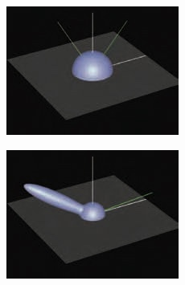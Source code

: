 \begin{figure}
\begin{fullwidth}
\begin{center}
	\begin{subfigure}[b]{0.328\thewidth}
		\includegraphics[width=1.\textwidth]{graphics/gi/ray-optics-8-1}
	\end{subfigure}
	\begin{subfigure}[b]{0.328\thewidth}
		\includegraphics[width=1.\textwidth]{graphics/gi/ray-optics-8-2}
	\end{subfigure}
	\begin{subfigure}[b]{0.328\thewidth}

\end{subfigure}
\end{center}
\end{fullwidth}
\end{figure}
